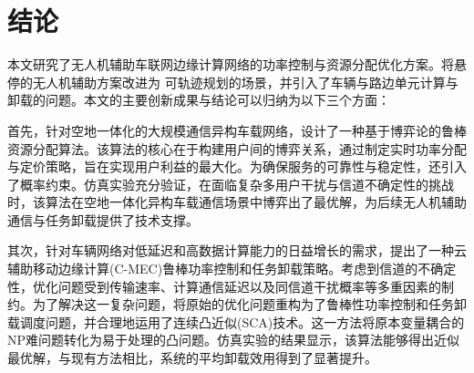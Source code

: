 \chapter{结论} \label{chap:equcc}
\begin{comment}
首先，针对空地一体化的大规模通信异构车载网络，提出了一种基于博弈的鲁
棒资源分配算法，该方案以用户间的博弈关系为核心，制定了实时功率分配和定价
策略，在新颖的优化方案中实现了用户利益的最大化。引入了概率约束，以确保用
户服务的可靠性和稳定性。仿真结果表明，所提算法具有复杂多用户干扰和信道不
确定性的空地一体化异构车载通信场景下是有效的。

其次，针对车辆网络越来越高的低延迟高数据计算的需求，提出了云辅助 MEC
的鲁棒功率控制和任务卸载的新方法。由于信道存在不确定性，优化问题受到传输
速率、计算通信延迟和同信道干扰概率形式的限制。最初的优化问题被表述为鲁棒
性功率控制和任务卸载调度问题，应用了 SCA 技术，将变量耦合的 NP 难问题转化
为可处理的凸问题。仿真结果表明，我们提出的算法得到了近似最优解。与现有方
法相比，系统平均卸载效用得到显著改善。

最后，考虑了更加实际的物理场景，将无人机辅助通信与任务卸载相结合，提
出了一种高效的天地一体化的无人机辅助双向车道的车辆通信方案。构建了车辆通
信时的吞吐量与通信及无人机飞行能耗的基本平衡方案。通过优化车辆的发射功率
与无人机的飞行轨迹，以及时隙的分配，可以使得系统的能效最大化，数值仿真表
明，该方案在能效方面的性能明显高于其他方法并可显著提升车联网通信效率。
\end{comment}
本文研究了无人机辅助车联网边缘计算网络的功率控制与资源分配优化方案。将悬停的无人机辅助方案改进为
可轨迹规划的场景，并引入了车辆与路边单元计算与卸载的问题。本文的主要创新成果与结论可以归纳为以下三个方面：

首先，针对空地一体化的大规模通信异构车载网络，设计了一种基于博弈论的鲁棒资源分配算法。该算法的核心在于构建用户间的博弈关系，通过制定实时功率分配与定价策略，旨在实现用户利益的最大化。为确保服务的可靠性与稳定性，还引入了概率约束。仿真实验充分验证，在面临复杂多用户干扰与信道不确定性的挑战时，该算法在空地一体化异构车载通信场景中博弈出了最优解，为后续无人机辅助通信与任务卸载提供了技术支撑。

其次，针对车辆网络对低延迟和高数据计算能力的日益增长的需求，提出了一种云辅助移动边缘计算(C-MEC)鲁棒功率控制和任务卸载策略。考虑到信道的不确定性，优化问题受到传输速率、计算通信延迟以及同信道干扰概率等多重因素的制约。为了解决这一复杂问题，将原始的优化问题重构为了鲁棒性功率控制和任务卸载调度问题，并合理地运用了连续凸近似(SCA)技术。这一方法将原本变量耦合的NP难问题转化为易于处理的凸问题。仿真实验的结果显示，该算法能够得出近似最优解，与现有方法相比，系统的平均卸载效用得到了显著提升。

